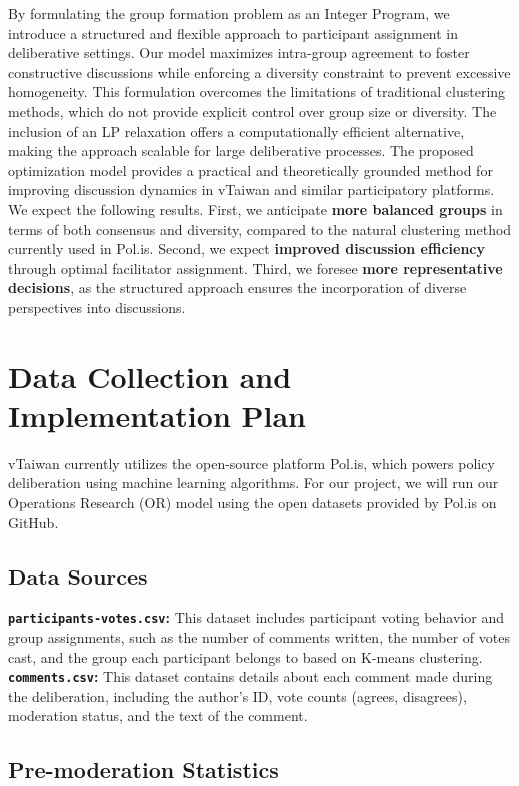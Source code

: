 \documentclass[11pt,a4paper]{article}
\begin{document}
By formulating the group formation problem as an Integer Program, we introduce a structured and flexible approach to participant assignment in deliberative settings. Our model maximizes intra-group agreement to foster constructive discussions while enforcing a diversity constraint to prevent excessive homogeneity. This formulation overcomes the limitations of traditional clustering methods, which do not provide explicit control over group size or diversity. The inclusion of an LP relaxation offers a computationally efficient alternative, making the approach scalable for large deliberative processes. The proposed optimization model provides a practical and theoretically grounded method for improving discussion dynamics in vTaiwan and similar participatory platforms. 
We expect the following results. First, we anticipate \textbf{more balanced groups} in terms of both consensus and diversity, compared to the natural clustering method currently used in Pol.is. Second, we expect \textbf{improved discussion efficiency} through optimal facilitator assignment. Third, we foresee \textbf{more representative decisions}, as the structured approach ensures the incorporation of diverse perspectives into discussions.

\section{Data Collection and Implementation Plan}

vTaiwan currently utilizes the open-source platform Pol.is, which powers policy deliberation using machine learning algorithms. For our project, we will run our Operations Research (OR) model using the open datasets provided by Pol.is on GitHub.

\subsection{Data Sources}

\textbf{\texttt{participants-votes.csv}:} This dataset includes participant voting behavior and group assignments, such as the number of comments written, the number of votes cast, and the group each participant belongs to based on K-means clustering. \\
\textbf{\texttt{comments.csv}:} This dataset contains details about each comment made during the deliberation, including the author's ID, vote counts (agrees, disagrees), moderation status, and the text of the comment.

\subsection{Pre-moderation Statistics}
\end{document}
